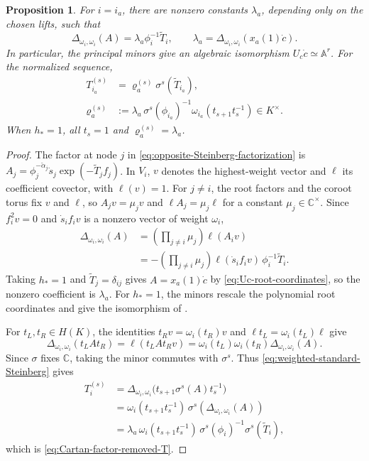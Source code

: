 \documentclass[11pt,leqno]{amsart}
\numberwithin{equation}{section}
\theoremstyle{plain}
\newtheorem{proposition}[theorem]{Proposition}
\theoremstyle{definition}
\theoremstyle{plain}
\theoremstyle{definition}
\theoremstyle{remark}
\begin{document}
\begin{proposition}\label{prop:Cartan-factor-removal}
For $i=i_a$, there are nonzero constants $\lambda_a$, depending only on the chosen lifts, such that
\begin{equation}\label{eq:minor-root-coordinate-sign}
 \Delta_{\omega_i,\omega_i}(A)
     =\lambda_a\phi_i^{-1}\widetilde T_i,
 \qquad
 \lambda_a=\Delta_{\omega_i,\omega_i}(x_a(1)\dot c).
\end{equation}
In particular, the principal minors give an algebraic isomorphism $U_c\dot c\simeq\mathbb A^r$.  For the normalized sequence,
\begin{equation}\label{eq:Cartan-factor-removed-T}
 \begin{aligned}
 T_{i_a}^{(s)}&=\varrho_a^{(s)}\sigma^s(\widetilde T_{i_a}),\\
 \varrho_a^{(s)}&:=\lambda_a\,\sigma^s(\phi_{i_a})^{-1}
             \omega_{i_a}(t_{s+1}t_s^{-1})\in K^\times.
 \end{aligned}
\end{equation}
When $h_*=1$, all $t_s=1$ and $\varrho_a^{(s)}=\lambda_a$.
\end{proposition}
\begin{proof}
The factor at node $j$ in \eqref{eq:opposite-Steinberg-factorization} is $A_j=\phi_j^{-\check\alpha_j}\dot s_j\exp(-\widetilde T_j f_j)$.  In $V_i$, $v$ denotes the highest-weight vector and $\ell$ its coefficient covector, with $\ell(v)=1$.  For $j\ne i$, the root factors and the coroot torus fix $v$ and $\ell$, so $A_jv=\mu_jv$ and $\ell A_j=\mu_j\ell$ for a constant $\mu_j\in\mathbb C^\times$.  Since $f_i^2v=0$ and $\dot s_i f_iv$ is a nonzero vector of weight $\omega_i$,
\[
 \begin{aligned}
 \Delta_{\omega_i,\omega_i}(A)
 &=\left(\prod_{j\ne i}\mu_j\right)\ell(A_i v)\\
 &=-\left(\prod_{j\ne i}\mu_j\right)\ell(\dot s_i f_i v)\,
       \phi_i^{-1}\widetilde T_i.
 \end{aligned}
\]
Taking $h_*=1$ and $\widetilde T_j=\delta_{ij}$ gives $A=x_a(1)\dot c$ by \eqref{eq:Uc-root-coordinates}, so the nonzero coefficient is $\lambda_a$.  For $h_*=1$, the minors rescale the polynomial root coordinates and give the isomorphism of \cite[Section~2.1]{FL2025}.

For $t_L,t_R\in H(K)$, the identities $t_Rv=\omega_i(t_R)v$ and $\ell t_L=\omega_i(t_L)\ell$ give
\[
 \Delta_{\omega_i,\omega_i}(t_L A t_R)
 =\ell(t_L A t_R v)
 =\omega_i(t_L)\omega_i(t_R)\Delta_{\omega_i,\omega_i}(A).
\]
Since $\sigma$ fixes $\mathbb C$, taking the minor commutes with $\sigma^s$.  Thus \eqref{eq:weighted-standard-Steinberg} gives
\[
 \begin{aligned}
 T_i^{(s)}
 &=\Delta_{\omega_i,\omega_i}\bigl(t_{s+1}\sigma^s(A)t_s^{-1}\bigr)\\
 &=\omega_i(t_{s+1}t_s^{-1})\,\sigma^s\!\left(\Delta_{\omega_i,\omega_i}(A)\right)\\
 &=\lambda_a\,\omega_i(t_{s+1}t_s^{-1})\,
      \sigma^s(\phi_i)^{-1}\sigma^s(\widetilde T_i),
 \end{aligned}
\]
which is \eqref{eq:Cartan-factor-removed-T}.
\end{proof}
\end{document}
